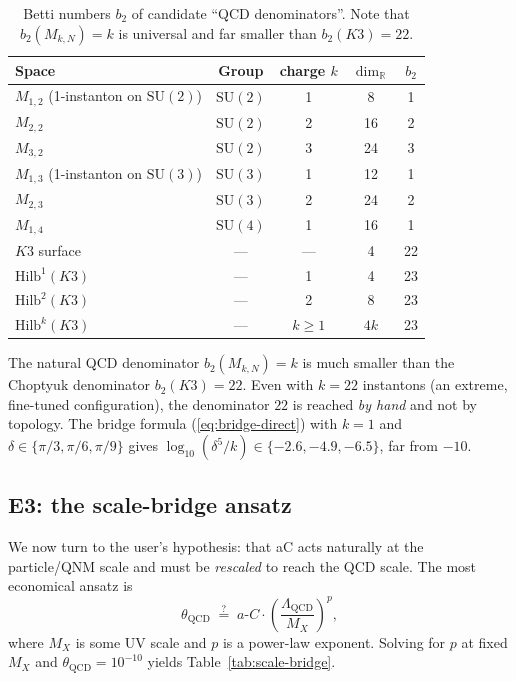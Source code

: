 \documentclass[11pt,a4paper]{article}
\newcommand{\aC}{a\text{-}C}
\newcommand{\LamQ}{\Lambda_{\mathrm{QCD}}}
\newcommand{\SU}{\mathrm{SU}}
\theoremstyle{plain}
\theoremstyle{definition}
\theoremstyle{remark}
\begin{document}
\begin{table}[htbp]
\centering
\small
\caption{Betti numbers $b_2$ of candidate ``QCD denominators''.  Note
that $b_2(M_{k,N}) = k$ is universal and far smaller than $b_2(K3)=22$.}
\label{tab:b2-instanton}
\begin{tabular}{lcccc}
\toprule
Space & Group & charge $k$ & $\dim_\mathbb{R}$ & $b_2$ \\
\midrule
$M_{1,2}$ (1-instanton on $\SU(2)$) & $\SU(2)$ & 1 & 8 & 1 \\
$M_{2,2}$ & $\SU(2)$ & 2 & 16 & 2 \\
$M_{3,2}$ & $\SU(2)$ & 3 & 24 & 3 \\
$M_{1,3}$ (1-instanton on $\SU(3)$) & $\SU(3)$ & 1 & 12 & 1 \\
$M_{2,3}$ & $\SU(3)$ & 2 & 24 & 2 \\
$M_{1,4}$ & $\SU(4)$ & 1 & 16 & 1 \\
\midrule
$K3$ surface & --- & --- & 4 & 22 \\
$\mathrm{Hilb}^1(K3)$ & --- & 1 & 4 & 23 \\
$\mathrm{Hilb}^2(K3)$ & --- & 2 & 8 & 23 \\
$\mathrm{Hilb}^k(K3)$ & --- & $k\geq 1$ & $4k$ & 23 \\
\bottomrule
\end{tabular}
\end{table}

\begin{keyfind}
The natural QCD denominator $b_2(M_{k,N}) = k$ is much smaller than
the Choptyuk denominator $b_2(K3) = 22$.  Even with $k=22$ instantons
(an extreme, fine-tuned configuration), the denominator $22$ is reached
\emph{by hand} and not by topology.  The bridge formula
(\ref{eq:bridge-direct}) with $k=1$ and $\delta\in\{\pi/3,\pi/6,\pi/9\}$
gives $\log_{10}(\delta^5/k)\in\{-2.6, -4.9, -6.5\}$, far from $-10$.
\end{keyfind}

\subsection{E3: the scale-bridge ansatz}\label{ssec:E3}

We now turn to the user's hypothesis: that \aC{} acts naturally at the
particle/QNM scale and must be \emph{rescaled} to reach the QCD scale.
The most economical ansatz is
\begin{equation}\label{eq:scale-bridge}
  \theta_{\mathrm{QCD}} \;\stackrel{?}{=}\;
  \aC \cdot \left(\frac{\LamQ}{M_X}\right)^p,
\end{equation}
where $M_X$ is some UV scale and $p$ is a power-law exponent.  Solving
for $p$ at fixed $M_X$ and $\theta_{\mathrm{QCD}} = 10^{-10}$ yields
Table~\ref{tab:scale-bridge}.
\end{document}
